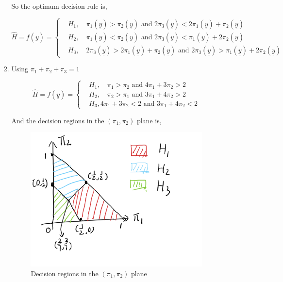 \documentclass[a4paper]{article}
\begin{document}
\begin{enumerate}
\begin{enumerate}
\begin{enumerate}
    So the optimum decision rule is,

    \begin{equation}
      \hat H = f(\underline{y}) = \left\{
        \begin{aligned}
          &H_1, \quad \pi_1(\underline{y}) > \pi_2(\underline{y}) \text{ and } 2\pi_3(\underline{y})<2\pi_1(\underline{y}) + \pi_2(\underline{y}) \\
          &H_2, \quad \pi_1(\underline{y}) < \pi_2(\underline{y}) \text{ and } 2\pi_3(\underline{y})<\pi_1(\underline{y}) + 2\pi_2(\underline{y}) \\
          &H_3, \quad 2\pi_3(\underline{y})> 2\pi_1(\underline{y}) + \pi_2(\underline{y}) \text{ and }  2\pi_3(\underline{y})> \pi_1(\underline{y}) + 2\pi_2(\underline{y})
        \end{aligned}
        \right.
    \end{equation}

    \item Using $\pi_1 +\pi_2 + \pi_3 =1$
    
    \begin{equation}
      \hat H = f(\underline{y}) = \left\{
        \begin{aligned}
          &H_1, \quad \pi_1 > \pi_2\text{ and } 4\pi_1+ 3\pi_2 > 2\\
          &H_2, \quad \pi_2 > \pi_1 \text{ and } 3\pi_1+ 4\pi_2 > 2 \\
          &H_3,  4\pi_1+ 3\pi_2 < 2 \text{ and }  3\pi_1+ 4\pi_2 < 2
        \end{aligned}
        \right.
    \end{equation}

    And the decision regions in the $(\pi_1, \pi_2)$ plane is,

    \begin{figure}[!htbp]
      \centering
      \includegraphics[width=0.5\linewidth]{decision-plane.png}
      \caption{Decision regions in the $(\pi_1, \pi_2)$ plane}
    \end{figure}
  \end{enumerate}


\end{enumerate}
\end{enumerate}
\end{document}
